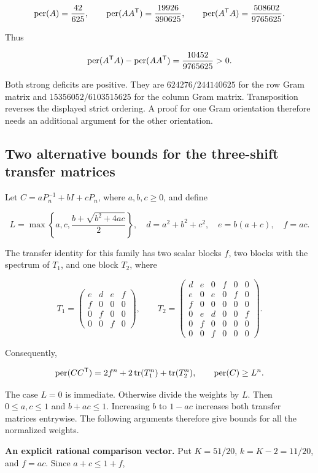 \[
\operatorname{per}(A)=\frac{42}{625},\qquad
\operatorname{per}(AA^{\mathsf{T}})=\frac{19926}{390625},\qquad
\operatorname{per}(A^{\mathsf{T}}A)=\frac{508602}{9765625}.
\]

Thus

\[
\operatorname{per}(A^{\mathsf{T}}A)-\operatorname{per}(AA^{\mathsf{T}})
=\frac{10452}{9765625}>0.
\]

Both strong deficits are positive. They are \(624276/244140625\) for the row Gram matrix and \(15356052/6103515625\) for the column Gram matrix. Transposition reverses the displayed strict ordering. A proof for one Gram orientation therefore needs an additional argument for the other orientation.

\subsection{Two alternative bounds for the three-shift transfer matrices}\label{app:additional-28}

Let \(C=aP_n^{-1}+bI+cP_n\), where \(a,b,c\ge0\), and define

\[
L=\max\left\{a,c,\frac{b+\sqrt{b^2+4ac}}2\right\},\quad
 d=a^2+b^2+c^2,\quad e=b(a+c),\quad f=ac.
\]

The transfer identity for this family has two scalar blocks \(f\), two blocks with the spectrum of \(T_1\), and one block \(T_2\), where

\[
T_1=\begin{pmatrix}e&d&e&f\\f&0&0&0\\0&f&0&0\\0&0&f&0\end{pmatrix},
\qquad
T_2=\begin{pmatrix}
d&e&0&f&0&0\\e&0&e&0&f&0\\f&0&0&0&0&0\\
0&e&d&0&0&f\\0&f&0&0&0&0\\0&0&f&0&0&0
\end{pmatrix}.
\]

Consequently,

\[
\operatorname{per}(CC^{\mathsf{T}})=2f^n+2\operatorname{tr}(T_1^n)+\operatorname{tr}(T_2^n),
\qquad \operatorname{per}(C)\ge L^n.
\]

The case \(L=0\) is immediate. Otherwise divide the weights by \(L\). Then \(0\le a,c\le1\) and \(b+ac\le1\). Increasing \(b\) to \(1-ac\) increases both transfer matrices entrywise. The following arguments therefore give bounds for all the normalized weights.

\textbf{An explicit rational comparison vector.} Put \(K=51/20\), \(k=K-2=11/20\), and \(f=ac\). Since \(a+c\le1+f\),

